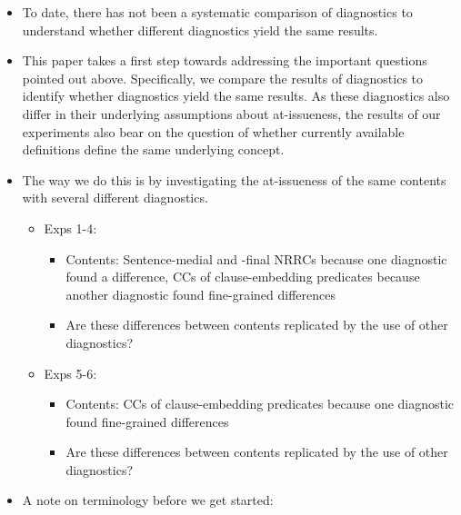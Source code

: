 \documentclass[times,linguex,xcolor]{glossa}
\begin{document}
\begin{itemize}[leftmargin=12pt]
\begin{itemize}
\end{itemize}

\item To date, there has not been a systematic comparison of diagnostics to understand whether different diagnostics yield the same results.

\item This paper takes a first step towards addressing the important questions pointed out above. Specifically, we compare the results of diagnostics to identify whether diagnostics yield the same results. As these diagnostics also differ in their underlying assumptions about at-issueness, the results of our experiments also bear on the question of whether currently available definitions define the same underlying concept.

\item The way we do this is by investigating the at-issueness of the same contents with several different diagnostics. 

\begin{itemize}

\item Exps 1-4:  

\begin{itemize}

\item Contents: Sentence-medial and -final NRRCs because one diagnostic found a difference, CCs of clause-embedding predicates because another diagnostic found fine-grained differences

\item Are these differences between contents replicated by the use of other diagnostics?

\end{itemize}

\item Exps 5-6:

\begin{itemize}

\item Contents: CCs of clause-embedding predicates because one diagnostic found fine-grained differences

\item Are these differences between contents replicated by the use of other diagnostics?

\end{itemize}

\end{itemize}

\item A note on terminology before we get started:


\end{itemize}
\end{document}
